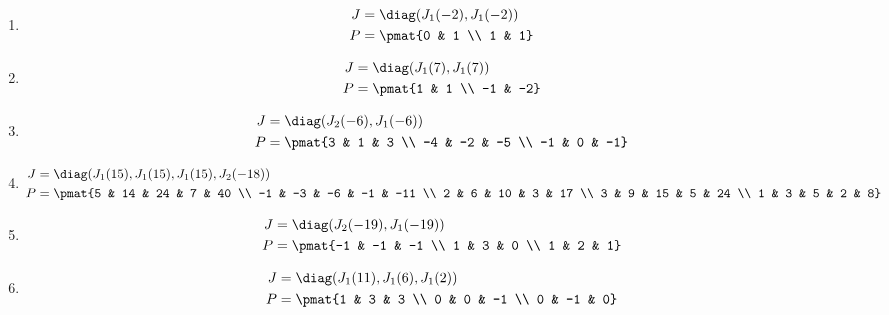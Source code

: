 \begin{enumerate}
\item

\begin{align*}
J &= \diag(J_{1}(-2), J_{1}(-2))\\
P &= \pmat{0 & 1 \\ 1 & 1}
\end{align*}

\item

\begin{align*}
J &= \diag(J_{1}(7), J_{1}(7))\\
P &= \pmat{1 & 1 \\ -1 & -2}
\end{align*}

\item

\begin{align*}
J &= \diag(J_{2}(-6), J_{1}(-6))\\
P &= \pmat{3 & 1 & 3 \\ -4 & -2 & -5 \\ -1 & 0 & -1}
\end{align*}

\item

\begin{align*}
J &= \diag(J_{1}(15), J_{1}(15), J_{1}(15), J_{2}(-18))\\
P &= \pmat{5 & 14 & 24 & 7 & 40 \\ -1 & -3 & -6 & -1 & -11 \\ 2 & 6 & 10 & 3 & 17 \\ 3 & 9 & 15 & 5 & 24 \\ 1 & 3 & 5 & 2 & 8}
\end{align*}

\item

\begin{align*}
J &= \diag(J_{2}(-19), J_{1}(-19))\\
P &= \pmat{-1 & -1 & -1 \\ 1 & 3 & 0 \\ 1 & 2 & 1}
\end{align*}

\item

\begin{align*}
J &= \diag(J_{1}(11), J_{1}(6), J_{1}(2))\\
P &= \pmat{1 & 3 & 3 \\ 0 & 0 & -1 \\ 0 & -1 & 0}
\end{align*}


\end{enumerate}
